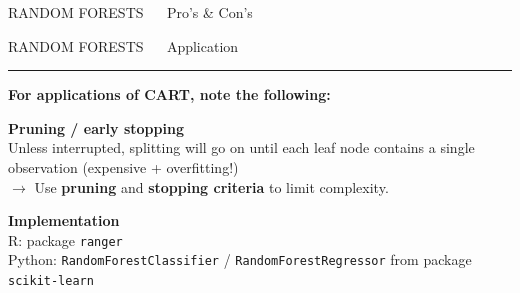 \documentclass[11pt,compress,t,notes=noshow, xcolor=table]{beamer}
\begin{document}
\begin{frame}{\textcolor{gray!80}{RANDOM FORESTS} ~~ Pro's \& Con's}
\vfill

\small


\end{frame}


\LARGE
\begin{frame}{\textcolor{gray!80}{RANDOM FORESTS} ~~ Application}
\normalsize
\vspace{-0.5cm}
\noindent \textcolor{gray!80}{\rule{\textwidth}{1pt}}

\vspace{0.3cm}

\textbf{For applications of CART, note the following:}
\lz

\textbf{\textcolor{gray!80}{Pruning / early stopping}} \\
\smallskip
Unless interrupted, splitting will go on until each leaf node contains a single 
observation (expensive + overfitting!) \\
\smallskip
$\rightarrow$ Use \textbf{pruning} and \textbf{stopping criteria} to limit 
complexity.

\lz
\textbf{\textcolor{gray!80}{Implementation}} \\
\smallskip
R: package \texttt{ranger}\\
Python: \texttt{RandomForestClassifier} / \texttt{RandomForestRegressor} from 
package \texttt{scikit-learn}

\end{frame}


\endlecture
\end{document}
